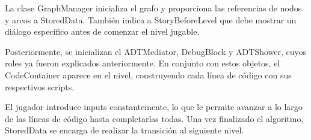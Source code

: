 La clase GraphManager inicializa el grafo y proporciona las referencias de nodos y arcos a StoredData. También indica a StoryBeforeLevel que debe mostrar un diálogo específico antes de comenzar el nivel jugable.

Posteriormente, se inicializan el ADTMediator, DebugBlock y ADTShower, cuyos roles ya fueron explicados anteriormente. En conjunto con estos objetos, el CodeContainer aparece en el nivel, construyendo cada línea de código con sus respectivos scripts.

El jugador introduce inputs constantemente, lo que le permite avanzar a lo largo de las líneas de código hasta completarlas todas. Una vez finalizado el algoritmo, StoredData se encarga de realizar la transición al siguiente nivel.







